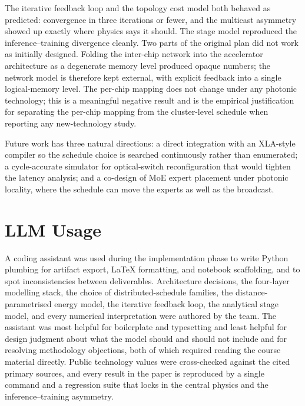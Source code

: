 \documentclass[conference]{IEEEtran}
\begin{document}
The iterative feedback loop and the topology cost model both
behaved as predicted: convergence in three iterations or fewer,
and the multicast asymmetry showed up exactly where physics says
it should. The stage model reproduced the inference--training
divergence cleanly. Two parts of the original plan did not work
as initially designed. Folding the inter-chip network into the
accelerator architecture as a degenerate memory level produced
opaque numbers; the network model is therefore kept external,
with explicit feedback into a single logical-memory level. The
per-chip mapping does not change under any photonic technology;
this is a meaningful negative result and is the empirical
justification for separating the per-chip mapping from the
cluster-level schedule when reporting any new-technology study.

Future work has three natural directions: a direct integration
with an XLA-style compiler so the schedule choice is searched
continuously rather than enumerated; a cycle-accurate simulator
for optical-switch reconfiguration that would tighten the latency
analysis; and a co-design of MoE expert placement under photonic
locality, where the schedule can move the experts as well as the
broadcast.

\section{LLM Usage}
A coding assistant was used during the implementation phase to
write Python plumbing for artifact export, LaTeX formatting, and
notebook scaffolding, and to spot inconsistencies between
deliverables. Architecture decisions, the four-layer modelling
stack, the choice of distributed-schedule families, the
distance-parametrised energy model, the iterative feedback loop,
the analytical stage model, and every numerical interpretation
were authored by the team. The assistant was most helpful for
boilerplate and typesetting and least helpful for design
judgment about what the model should and should not include and
for resolving methodology objections, both of which required
reading the course material directly. Public technology values
were cross-checked against the cited primary sources, and every
result in the paper is reproduced by a single command and a
regression suite that locks in the central physics and the
inference--training asymmetry.
\end{document}
